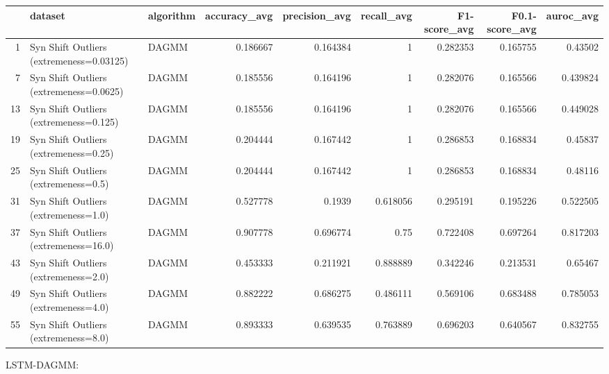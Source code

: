 \begin{tabular}{rllrrrrrr}
\hline
    & dataset                                  & algorithm   &   accuracy\_avg &   precision\_avg &   recall\_avg &   F1-score\_avg &   F0.1-score\_avg &   auroc\_avg \\
\hline
  1 & Syn Shift Outliers (extremeness=0.03125) & DAGMM       &       0.186667 &        0.164384 &     1        &       0.282353 &         0.165755 &    0.43502  \\
  7 & Syn Shift Outliers (extremeness=0.0625)  & DAGMM       &       0.185556 &        0.164196 &     1        &       0.282076 &         0.165566 &    0.439824 \\
 13 & Syn Shift Outliers (extremeness=0.125)   & DAGMM       &       0.185556 &        0.164196 &     1        &       0.282076 &         0.165566 &    0.449028 \\
 19 & Syn Shift Outliers (extremeness=0.25)    & DAGMM       &       0.204444 &        0.167442 &     1        &       0.286853 &         0.168834 &    0.45837  \\
 25 & Syn Shift Outliers (extremeness=0.5)     & DAGMM       &       0.204444 &        0.167442 &     1        &       0.286853 &         0.168834 &    0.48116  \\
 31 & Syn Shift Outliers (extremeness=1.0)     & DAGMM       &       0.527778 &        0.1939   &     0.618056 &       0.295191 &         0.195226 &    0.522505 \\
 37 & Syn Shift Outliers (extremeness=16.0)    & DAGMM       &       0.907778 &        0.696774 &     0.75     &       0.722408 &         0.697264 &    0.817203 \\
 43 & Syn Shift Outliers (extremeness=2.0)     & DAGMM       &       0.453333 &        0.211921 &     0.888889 &       0.342246 &         0.213531 &    0.65467  \\
 49 & Syn Shift Outliers (extremeness=4.0)     & DAGMM       &       0.882222 &        0.686275 &     0.486111 &       0.569106 &         0.683488 &    0.785053 \\
 55 & Syn Shift Outliers (extremeness=8.0)     & DAGMM       &       0.893333 &        0.639535 &     0.763889 &       0.696203 &         0.640567 &    0.832755 \\
\hline
\end{tabular}

LSTM-DAGMM:


